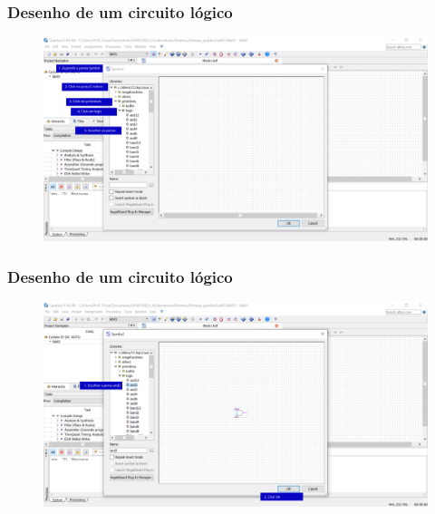 \documentclass{CPSPresentation}
\begin{document}
\begin{frame}
	\frametitle{Desenho de um circuito lógico}
	
	
	\begin{figure}[h]
		\centering
		\includegraphics[width=1.02\textwidth]{quartus/fig06.pdf}
	\end{figure}
	
	
\end{frame}
\begin{frame}
	\frametitle{Desenho de um circuito lógico}
	
	
	\begin{figure}[h]
		\centering
		\includegraphics[width=1.02\textwidth]{quartus/fig07.pdf}
	\end{figure}
	
	
\end{frame}
\end{document}
